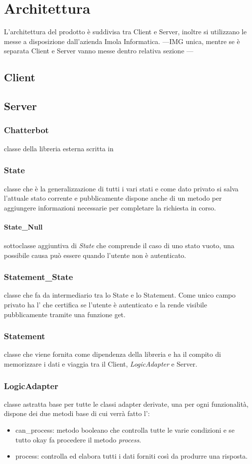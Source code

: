 \section{Architettura}
L'architettura del prodotto è suddivisa tra Client e Server, inoltre si utilizzano le  messe a disposizione dall'azienda Imola Informatica.
---IMG unica, mentre se è separata Client e Server vanno messe dentro relativa sezione ---
\subsection{Client}
\subsection{Server}
\subsubsection{Chatterbot} classe della libreria esterna scritta in 
\subsubsection{State} classe che è la generalizzazione di tutti i vari stati e 
come dato privato si salva l'attuale stato corrente e pubblicamente dispone anche di un metodo per aggiungere 
informazioni necessarie per completare la richiesta in corso.
\paragraph*{State\_Null} sottoclasse aggiuntiva di \textit{State} che comprende il caso di uno stato vuoto, una possibile causa può essere quando l'utente non è autenticato.
\subsubsection{Statement\_State} classe che fa da intermediario tra lo State e lo Statement. Come unico campo privato ha l' che certifica se l'utente è autenticato e la rende visibile pubblicamente tramite una funzione get.
\subsubsection{Statement} classe che viene fornita come dipendenza della libreria  e ha il compito di memorizzare i dati e viaggia tra il Client, \textit{LogicAdapter} e Server.
\subsubsection{LogicAdapter} classe astratta base per tutte le classi adapter derivate, una per ogni funzionalità, dispone dei due metodi base di cui verrà fatto l':
    \begin{itemize}
        \item can\_process: metodo booleano che controlla tutte le varie condizioni e se tutto okay fa procedere il metodo \textit{process}.
        \item process: controlla ed elabora tutti i dati forniti così da produrre una risposta.
    \end{itemize}
